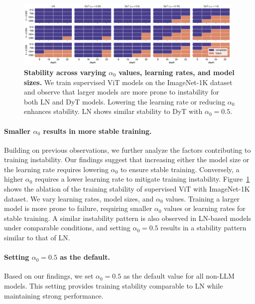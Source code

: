 \begin{figure}[b] 
\centering \includegraphics[width=0.98\textwidth]{figures/alpha_lr_relationship.pdf} \caption{\textbf{Stability across varying $\alpha_0$ values, learning rates, and model sizes.} We train supervised ViT models on the ImageNet-1K dataset and observe that larger models are more prone to instability for both LN and DyT models. Lowering the learning rate or reducing $\alpha_0$ enhances stability. LN shows similar stability to DyT with $\alpha_0 = 0.5$.}

\label{figure:alpha_lr}
\end{figure} 

\paragraph{Smaller $\alpha_0$ results in more stable training.} Building on previous observations, we further analyze the factors contributing to training instability. Our findings suggest that increasing either the model size or the learning rate requires lowering $\alpha_0$ to ensure stable training. Conversely, a higher $\alpha_0$ requires a lower learning rate to mitigate training instability.
Figure~\ref{figure:alpha_lr} shows the ablation of the training stability of supervised ViT with ImageNet-1K dataset. We vary learning rates, model sizes, and $\alpha_0$ values. Training a larger model is more prone to failure, requiring smaller $\alpha_0$ values or learning rates for stable training. A similar instability pattern is also observed in LN-based models under comparable conditions, and setting $\alpha_0 = 0.5$ results in a stability pattern similar to that of LN.


\paragraph{Setting $\alpha_0 = 0.5$ as the  default.} Based on our findings, we set $\alpha_0 = 0.5$ as the default value for all non-LLM models.
This setting provides training stability comparable to LN while maintaining strong performance.


